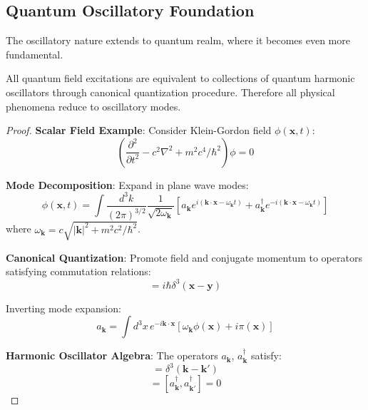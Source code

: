 \documentclass[11pt,onecolumn]{article}
\begin{document}
\subsection{Quantum Oscillatory Foundation}

The oscillatory nature extends to quantum realm, where it becomes even more fundamental.

\begin{theorem}
\label{thm:quantum_oscillatory}
All quantum field excitations are equivalent to collections of quantum harmonic oscillators through canonical quantization procedure. Therefore all physical phenomena reduce to oscillatory modes.
\end{theorem}

\begin{proof}
\textbf{Scalar Field Example}: Consider Klein-Gordon field $\phi(\mathbf{x}, t)$:
\begin{equation}
\left(\frac{\partial^2}{\partial t^2} - c^2 \nabla^2 + m^2 c^4 / \hbar^2\right) \phi = 0
\end{equation}

\textbf{Mode Decomposition}: Expand in plane wave modes:
\begin{equation}
\phi(\mathbf{x}, t) = \int \frac{d^3 k}{(2\pi)^{3/2}} \frac{1}{\sqrt{2\omega_{\mathbf{k}}}} \left[a_{\mathbf{k}} e^{i(\mathbf{k} \cdot \mathbf{x} - \omega_{\mathbf{k}} t)} + a_{\mathbf{k}}^{\dagger} e^{-i(\mathbf{k} \cdot \mathbf{x} - \omega_{\mathbf{k}} t)}\right]
\end{equation}
where $\omega_{\mathbf{k}} = c\sqrt{|\mathbf{k}|^2 + m^2c^2/\hbar^2}$.

\textbf{Canonical Quantization}: Promote field and conjugate momentum to operators satisfying commutation relations:
\begin{equation}
[\phi(\mathbf{x}, t), \pi(\mathbf{y}, t)] = i\hbar \delta^3(\mathbf{x} - \mathbf{y})
\end{equation}

Inverting mode expansion:
\begin{equation}
a_{\mathbf{k}} = \int d^3 x \, e^{-i\mathbf{k} \cdot \mathbf{x}} \left[\omega_{\mathbf{k}} \phi(\mathbf{x}) + i\pi(\mathbf{x})\right]
\end{equation}

\textbf{Harmonic Oscillator Algebra}: The operators $a_{\mathbf{k}}$, $a_{\mathbf{k}}^{\dagger}$ satisfy:
\begin{equation}
[a_{\mathbf{k}}, a_{\mathbf{k}'}^{\dagger}] = \delta^3(\mathbf{k} - \mathbf{k}')
\end{equation}
\begin{equation}
[a_{\mathbf{k}}, a_{\mathbf{k}'}] = [a_{\mathbf{k}}^{\dagger}, a_{\mathbf{k}'}^{\dagger}] = 0
\end{equation}


\end{proof}
\end{document}
